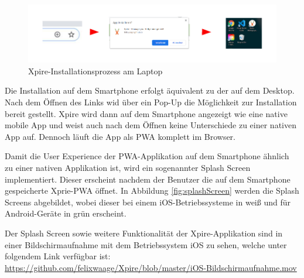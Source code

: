 \begin{figure}[h!]
	\centering
	\includegraphics[width=1.1\textwidth]{img/install.pdf}
	\caption{Xpire-Installationsprozess am Laptop}
	\label{fig:install}
\end{figure}

Die Installation auf dem Smartphone erfolgt äquivalent zu der auf dem Desktop. Nach dem Öffnen des Links wid über ein Pop-Up die Möglichkeit zur Installation bereit gestellt. Xpire wird dann auf dem Smartphone angezeigt wie eine native mobile App und weist auch nach dem Öffnen keine Unterschiede zu einer nativen App auf. Dennoch läuft die App als PWA komplett im Browser. 

Damit die User Experience der PWA-Applikation auf dem Smartphone ähnlich zu einer nativen Applikation ist, wird ein sogenannter Splash Screen implementiert. Dieser erscheint nachdem der Benutzer die auf dem Smartphone gespeicherte Xprie-PWA öffnet. In Abbildung \vref{fig:splashScreen} werden die Splash Screens abgebildet, wobei dieser bei einem iOS-Betriebssysteme in weiß und für Android-Geräte in grün erscheint.  

Der Splash Screen sowie weitere Funktionalität der Xpire-Applikation sind in einer Bildschirmaufnahme mit dem Betriebssystem iOS zu sehen, welche unter folgendem Link verfügbar ist:\\
\url{https://github.com/felixwaage/Xpire/blob/master/iOS-Bildschirmaufnahme.mov} 

